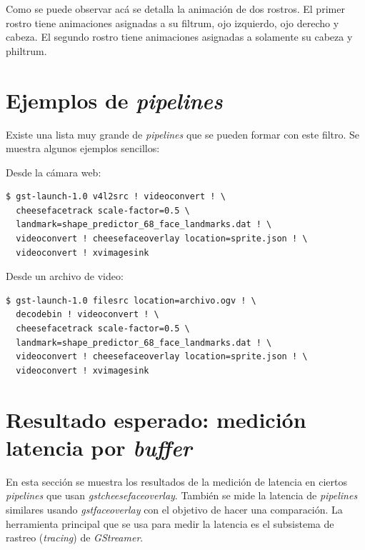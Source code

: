 \documentclass[a4paper,openright,12pt]{report}
\begin{document}
Como se puede observar acá se detalla la animación de dos rostros. El primer
rostro tiene animaciones asignadas a su filtrum, ojo izquierdo, ojo derecho y
cabeza. El segundo rostro tiene animaciones asignadas a solamente su cabeza y
philtrum.

\section{Ejemplos de \textit{pipelines}}
Existe una lista muy grande de \textit{pipelines} que se pueden formar con este
filtro. Se muestra algunos ejemplos sencillos:

Desde la cámara web:
\begin{verbatim}
$ gst-launch-1.0 v4l2src ! videoconvert ! \
  cheesefacetrack scale-factor=0.5 \
  landmark=shape_predictor_68_face_landmarks.dat ! \
  videoconvert ! cheesefaceoverlay location=sprite.json ! \
  videoconvert ! xvimagesink
\end{verbatim}

Desde un archivo de video:
\begin{verbatim}
$ gst-launch-1.0 filesrc location=archivo.ogv ! \
  decodebin ! videoconvert ! \
  cheesefacetrack scale-factor=0.5 \
  landmark=shape_predictor_68_face_landmarks.dat ! \
  videoconvert ! cheesefaceoverlay location=sprite.json ! \
  videoconvert ! xvimagesink
\end{verbatim}

\section{Resultado esperado: medición latencia por \textit{buffer}}
En esta sección se muestra los resultados de la medición de latencia en ciertos
\textit{pipelines} que usan \textit{gstcheesefaceoverlay}. También se mide la
latencia de \textit{pipelines} similares usando \textit{gstfaceoverlay} con el
objetivo de hacer una comparación. La herramienta principal que se usa para
medir la latencia es el subsistema de rastreo (\textit{tracing}) de
\textit{GStreamer}.
\end{document}
